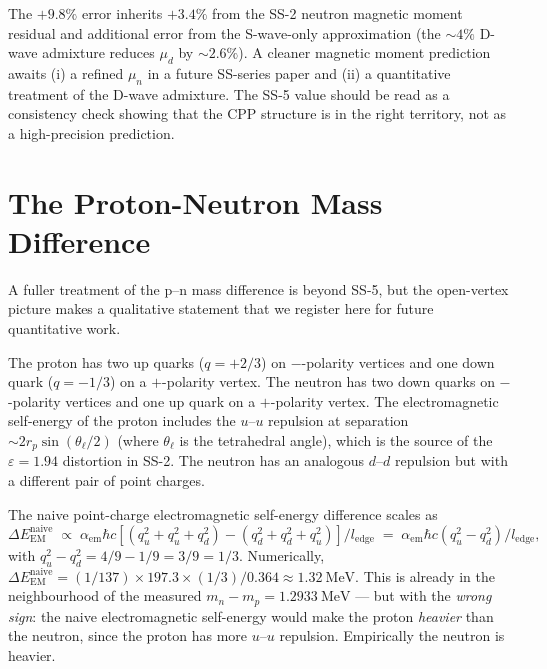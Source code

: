 \documentclass[11pt,letterpaper]{article}
\newcommand{\ledge}{l_{\mathrm{edge}}}
\newcommand{\rp}{r_{p}}
\begin{document}
The $+9.8\%$ error inherits $+3.4\%$ from the SS-2 neutron magnetic moment residual and additional error from the S-wave-only approximation (the $\sim 4\%$ D-wave admixture reduces $\mu_d$ by $\sim 2.6\%$). A cleaner magnetic moment prediction awaits (i) a refined $\mu_n$ in a future SS-series paper and (ii) a quantitative treatment of the D-wave admixture. The SS-5 value should be read as a consistency check showing that the CPP structure is in the right territory, not as a high-precision prediction.

\section{The Proton-Neutron Mass Difference}
\label{sec:pn_mass}

A fuller treatment of the p--n mass difference is beyond SS-5, but the open-vertex picture makes a qualitative statement that we register here for future quantitative work.

The proton has two up quarks ($q = +2/3$) on $-$-polarity vertices and one down quark ($q = -1/3$) on a $+$-polarity vertex. The neutron has two down quarks on $-$-polarity vertices and one up quark on a $+$-polarity vertex. The electromagnetic self-energy of the proton includes the $u$--$u$ repulsion at separation $\sim 2\rp \sin(\theta_\ell/2)$ (where $\theta_\ell$ is the tetrahedral angle), which is the source of the $\varepsilon = 1.94$ distortion in SS-2. The neutron has an analogous $d$--$d$ repulsion but with a different pair of point charges.

The naive point-charge electromagnetic self-energy difference scales as
\begin{equation}
\Delta E_{\mathrm{EM}}^{\mathrm{naive}} \;\propto\; \alpha_{\mathrm{em}}\hbar c \left[ (q_u^2 + q_u^2 + q_d^2) - (q_d^2 + q_d^2 + q_u^2) \right] / \ledge \;=\; \alpha_{\mathrm{em}}\hbar c (q_u^2 - q_d^2)/\ledge,
\label{eq:pn_naive}
\end{equation}
with $q_u^2 - q_d^2 = 4/9 - 1/9 = 3/9 = 1/3$. Numerically, $\Delta E_{\mathrm{EM}}^{\mathrm{naive}} = (1/137) \times 197.3 \times (1/3) / 0.364 \approx 1.32~\mathrm{MeV}$. This is already in the neighbourhood of the measured $m_n - m_p = 1.2933~\mathrm{MeV}$ --- but with the \emph{wrong sign}: the naive electromagnetic self-energy would make the proton \emph{heavier} than the neutron, since the proton has more $u$--$u$ repulsion. Empirically the neutron is heavier.
\end{document}
